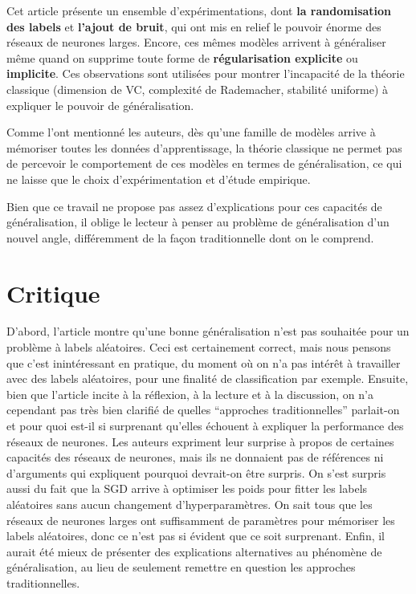 \documentclass[a4paper,english,12pt]{article}
\begin{document}
Cet article présente un ensemble d’expérimentations, dont \textbf{la randomisation des labels} et \textbf{l’ajout de bruit}, qui ont mis en relief le pouvoir énorme des réseaux de neurones larges. Encore, ces mêmes modèles arrivent à généraliser même quand on supprime toute forme de \textbf{régularisation explicite} ou \textbf{implicite}. Ces observations sont utilisées pour montrer l’incapacité de la théorie classique (dimension de VC, complexité de Rademacher, stabilité uniforme) à expliquer le pouvoir de généralisation.  

Comme l’ont mentionné les auteurs, dès qu’une famille de modèles arrive à mémoriser toutes les données d’apprentissage, la théorie classique ne permet pas de percevoir le comportement de ces modèles en termes de généralisation, ce qui ne laisse que le choix d’expérimentation et d’étude empirique.

Bien que ce travail ne propose pas assez d’explications pour ces capacités de généralisation, il oblige le lecteur à penser au problème de généralisation d’un nouvel angle, différemment de la façon traditionnelle dont on le comprend. 

\section{Critique}
D'abord, l’article montre qu’une bonne généralisation n’est pas souhaitée pour un problème à labels aléatoires. Ceci est certainement correct, mais nous pensons que c’est inintéressant en pratique, du moment où on n'a pas intérêt à travailler avec des labels aléatoires, pour une finalité de classification par exemple.  
Ensuite, bien que l’article incite à la réflexion, à la lecture et à la discussion, on n’a cependant pas très bien clarifié de quelles “approches traditionnelles” parlait-on et pour quoi est-il si surprenant qu’elles échouent à expliquer la performance des réseaux de neurones. Les auteurs expriment leur surprise à propos de certaines capacités des réseaux de neurones, mais ils ne donnaient pas de références ni d’arguments qui expliquent pourquoi devrait-on être surpris. 
On s'est surpris aussi du fait que la SGD arrive à optimiser les poids pour fitter les labels aléatoires sans aucun changement d'hyperparamètres. On sait tous que les réseaux de neurones larges ont suffisamment de paramètres pour mémoriser les labels aléatoires, donc ce n’est pas si évident que ce soit surprenant. 
Enfin, il aurait été mieux de présenter des explications alternatives au phénomène de généralisation, au lieu de seulement remettre en question les approches traditionnelles.
\end{document}
